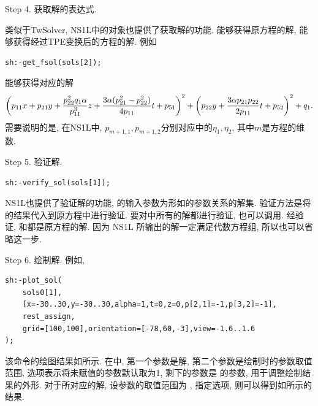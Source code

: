 Step 4. 获取解的表达式.

类似于TwSolver, NS1L中的对象也提供了获取解的功能. 能够获得原方程的解, 能够获得经过TPE变换后的方程的解. 例如
\begin{verbatim}
sh:-get_fsol(sols[2]);
\end{verbatim}
能够获得对应的解 
\begin{equation}
\left(p_{11}x+p_{21}y+\frac{p_{22}^2q_1\alpha}{p_{11}^3}z+\frac{3\alpha (p_{21}^2-p_{22}^2)}{4p_{11}}t+p_{51}\right)^2
+\left(p_{22}y+\frac{3\alpha p_{21}p_{22}}{2p_{11}}t+p_{52}\right)^2+q_1 .
\end{equation}
需要说明的是, 在NS1L中, $p_{m+1,1},p_{m+1,2}$分别对应中的$\eta_1,\eta_2$, 其中$m$是方程的维数. 

Step 5. 验证解.
\begin{verbatim}
sh:-verify_sol(sols[1]);
\end{verbatim}
NS1L也提供了验证解的功能, 的输入参数为形如的参数关系的解集. 验证方法是将的结果代入到原方程中进行验证. 要对中所有的解都进行验证, 也可以调用. 经验证, 和都是原方程的解. 因为 NS1L 所输出的解一定满足代数方程组, 所以也可以省略这一步.

Step 6. 绘制解. 例如, 
\begin{verbatim}
sh:-plot_sol(
    sols0[1],
    [x=-30..30,y=-30..30,alpha=1,t=0,z=0,p[2,1]=-1,p[3,2]=-1],
    rest_assign,
    grid=[100,100],orientation=[-78,60,-3],view=-1.6..1.6
);
\end{verbatim}
该命令的绘图结果如所示. 在中, 第一个参数是解, 第二个参数是绘制时的参数取值范围, 选项表示将未赋值的参数默认取为1, 剩下的参数是  的参数, 用于调整绘制结果的外形. 对于所对应的解, 设参数的取值范围为 \cd{[x=-30..30,y=-30..30,alpha=1,t=0,z=0]}, 指定选项, 则可以得到如所示的结果.


